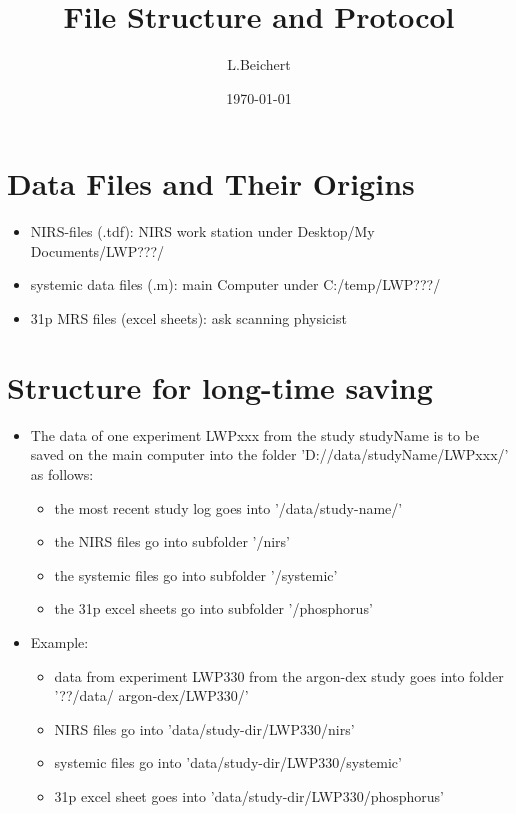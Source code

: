 \documentclass[11pt]{article}
\author{L.Beichert}
\title{File Structure and Protocol}
\date{\today}
\begin{document}
\section{Data Files and Their Origins}
\begin{itemize}
\item NIRS-files (.tdf): NIRS work station under Desktop/My Documents/LWP???/
\item systemic data files (.m): main Computer under C:/temp/LWP???/
\item 31p MRS files (excel sheets): ask scanning physicist
\end{itemize}

\section{Structure for long-time saving}
\begin{itemize}
\item The data of one experiment LWPxxx from the study studyName  is to be saved on the main computer into the folder  'D://data/studyName/LWPxxx/' as follows:
\begin{itemize}
	\item the most recent study log goes into '/data/study-name/'
	\item the NIRS files go into subfolder '/nirs'
	\item the systemic files go into subfolder '/systemic'
	\item the 31p excel sheets go into subfolder '/phosphorus'
\end{itemize}
\item Example:
\begin{itemize}
	\item data from experiment LWP330 from the argon-dex study goes into folder '??/data/		argon-dex/LWP330/'
	\item NIRS files go into 'data/study-dir/LWP330/nirs'
	\item systemic files go into 'data/study-dir/LWP330/systemic'
	\item 31p excel sheet goes into 'data/study-dir/LWP330/phosphorus'
\end{itemize}

\end{itemize}
\end{document}
